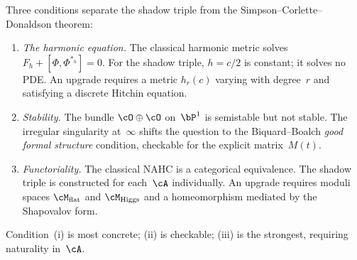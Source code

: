 \begin{remark}
\label{rem:nahc-upgrade}
Three conditions separate the shadow triple from the
Simpson--Corlette--Donaldson theorem:
\begin{enumerate}[label=\textup{(\roman*)}]
\item \emph{The harmonic equation.}
 The classical harmonic metric solves
 $F_h + [\Phi, \Phi^{*_h}] = 0$.
 For the shadow triple, $h = c/2$ is constant; it solves no
 PDE. An upgrade requires a metric $h_r(c)$ varying with
 degree~$r$ and satisfying a discrete Hitchin equation.
\item \emph{Stability.}
 The bundle $\cO\oplus\cO$ on~$\bP^1$ is semistable but not
 stable. The irregular singularity at~$\infty$ shifts the
 question to the Biquard--Boalch \emph{good formal structure}
 condition, checkable for the explicit matrix~$M(t)$.
\item \emph{Functoriality.}
 The classical NAHC is a categorical equivalence. The shadow
 triple is constructed for each~$\cA$ individually. An upgrade
 requires moduli spaces $\cM_{\mathrm{flat}}$ and
 $\cM_{\mathrm{Higgs}}$ and a homeomorphism mediated by the
 Shapovalov form.
\end{enumerate}
Condition~(i) is most concrete; (ii) is checkable; (iii) is the
strongest, requiring naturality in~$\cA$.
\end{remark}

